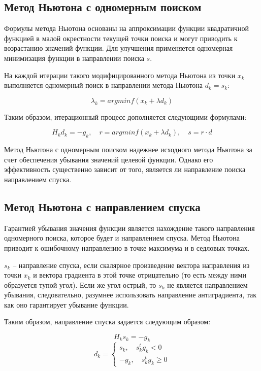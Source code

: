 \documentclass[12pt]{article}
\begin{document}
\subsection{Метод Ньютона с одномерным поиском}

Формулы метода Ньютона основаны на аппроксимации функции квадратичной функцией в малой окрестности текущей точки поиска и могут приводить к возрастанию значений функции. Для улучшения применяется одномерная минимизация функции в направлении поиска $s$.

На каждой итерации такого модифицированного метода Ньютона из точки $x_k$ выполняется одномерный поиск в направлении метода Ньютона $d_k = s_k$:

\[ \lambda_k = arg min f(x_k+\lambda d_k) \]

Таким образом, итерационный процесс дополняется следующими формулами:

\[ H_k d_k = -g_k, \quad r = arg min f(x_k+\lambda d_k), \quad s = r \cdot d \]

Метод Ньютона с одномерным поиском надежнее исходного метода Ньютона за счет обеспечения убывания значений целевой функции. Однако его эффективность существенно зависит от того, является ли направление поиска направлением спуска.

\subsection{Метод Ньютона с направлением спуска}

Гарантией убывания значения функции является нахождение такого направления одномерного поиска, которое будет и направлением спуска. Метод Ньютона приводит к ошибочному направлению в точке максимума и в седловых точках. 

$s_k$ -- направление спуска, если скалярное произведение вектора направления из точки $x_k$ и вектора градиента в этой точке отрицательно (то есть между ними образуется тупой угол). Если же угол острый, то $s_k$ не является направлением убывания, следовательно, разумнее использовать направление антиградиента, так как оно гарантирует убывание функции.

Таким образом, направление спуска задается следующим образом:

\[ H_k s_k = -g_k \]
\[ d_k = 
	\begin{cases}
		s_k, \quad s_k^t g_k < 0 \\
		-g_k, \quad s_k^t g_k \geq 0
	\end{cases}
\]
\end{document}
